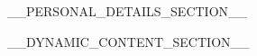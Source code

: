 \documentclass[11pt]{article}
\begin{document}
__PERSONAL_DETAILS_SECTION__

__DYNAMIC_CONTENT_SECTION__
\end{document}
